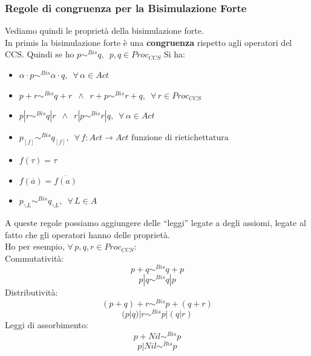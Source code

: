 \subsubsection{Regole di congruenza per la Bisimulazione Forte}
Vediamo quindi le proprietà della bisimulazione forte.\\
In primis la bisimulazione forte è una \textbf{congruenza} rispetto agli
operatori del CCS. Quindi se ho $p\sim^{Bis}q,\,\,\, p, q\in Proc_{CCS}$ Si ha:
\begin{itemize}
    \item $\alpha\cdot p\sim^{Bis} \alpha\cdot q,\,\,\,\forall\,\alpha\in Act$
    \item $p+r\sim^{Bis}q+r\,\,\,\land\,\,\,r+p\sim^{Bis} r+q,\,\,\,\forall\, r\in Proc_{CCS}$
    \item $p|r\sim^{Bis}q|r\,\,\,\land \,\,\, r|p\sim^{Bis}r|q,\,\,\,\forall\,\alpha\in
  Act$
\item $p_{[f]}\sim^{Bis}q_{[f]},\,\,\,\forall\, f:Act\to Act \mbox{ funzione di
    rietichettatura}$
    
  \item $f(\tau)=\tau$
  \item $f(\overline{a})=\overline{f(a)}$
  \item $p_{\backslash L}\sim^{Bis}q_{\backslash L},\,\,\,\forall\, L\in A$
\end{itemize}
A queste regole possiamo aggiungere delle ``leggi'' legate a degli assiomi,
legate al fatto che gli operatori hanno delle proprietà.\\
Ho per esempio, $\forall\, p, q, r\in Proc_{CCS}$:\\
Commutatività:
\[p+q\sim^{Bis}q+p\]
\[p|q\sim^{Bis}q|p\]
Distributività:
\[(p+q)+r\sim^{Bis}p+(q+r)\]
\[(p|q)|r\sim^{Bis} p|(q|r)\]
Leggi di assorbimento:
\[p+Nil\sim^{Bis} p\]
\[p|Nil\sim^{Bis} p\]
